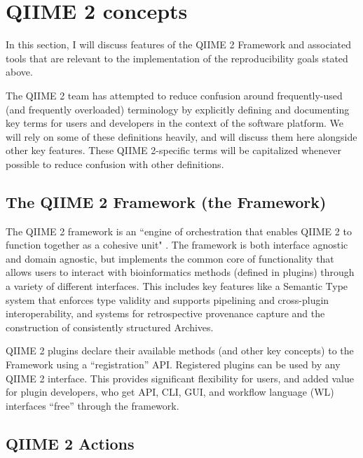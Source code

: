 \section{QIIME 2 concepts}

In this section, I will discuss features of the QIIME 2 Framework and associated
tools that are relevant to the implementation of the reproducibility goals
stated above. 

The QIIME 2 team has attempted to reduce confusion around frequently-used (and
frequently overloaded) terminology by explicitly defining and documenting key
terms for users \parencite{qiime_2_development_team_glossary_2016} and
developers \parencite{qiime_2_development_team_glossary_2018} in the context of
the software platform.  We will rely on some of these definitions heavily, and
will discuss them here alongside other key features. These QIIME 2-specific
terms will be capitalized whenever possible to reduce confusion with other
definitions.

\subsection{The QIIME 2 Framework (the Framework)}

The QIIME 2 framework is an “engine of orchestration that enables QIIME 2 to
function together as a cohesive unit" \parencite{qiime_2_development_team_glossary_2018}.
The framework is both interface agnostic and domain agnostic, but implements the
common core of functionality that allows users to interact with bioinformatics
methods (defined in plugins) through a variety of different interfaces. This
includes key features like a Semantic Type system that enforces type validity
and supports pipelining and cross-plugin interoperability, and systems for
retrospective provenance capture and the construction of consistently structured
Archives.

QIIME 2 plugins declare their available methods (and other key concepts) to the
Framework using a “registration” API. Registered plugins can be used by any
QIIME 2 interface. This provides significant flexibility for users, and added
value for plugin developers, who get API, CLI, GUI, and workflow language (WL)
interfaces “free” through the framework.

\subsection{QIIME 2 Actions}

